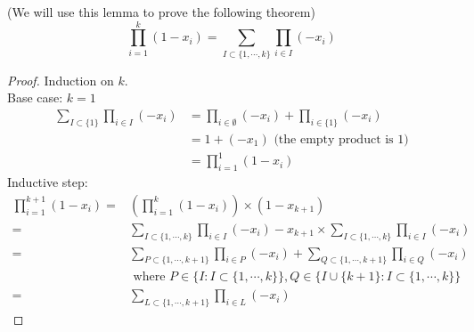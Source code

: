 \begin{lemma}
    (We will use this lemma to prove the following theorem)
    $$\prod_{i=1}^k(1-x_i)=\sum_{I \subset \{1,\cdots,k\}} \prod_{i \in I}(-x_i)$$
\end{lemma}
\begin{proof}
    Induction on $k$.\\
    Base case: $k=1$ 
    \begin{equation}
        \begin{split}
            \sum_{I \subset \{1\}} \prod_{i \in I}(-x_i) &= \prod_{i \in \emptyset}(-x_i)+ \prod_{i \in \{1\}}(-x_i)\\
            &= 1 + (-x_1) \text{ (the empty product is 1)}\\
            &= \prod_{i=1}^1(1-x_i)
        \end{split}
    \end{equation}
    Inductive step:
    \begin{equation}
        \begin{split}
            \prod_{i=1}^{k+1}(1-x_i) =& (\prod_{i=1}^{k}(1-x_i))\times (1-x_{k+1})\\
            =& \sum_{I \subset \{1,\cdots,k\}} \prod_{i \in I}(-x_i) - x_{k+1} \times \sum_{I \subset \{1,\cdots,k\}} \prod_{i \in I}(-x_i)\\
            =& \sum_{P \subset \{1,\cdots,k+1\}} \prod_{i \in P}(-x_i) + \sum_{Q \subset \{1,\cdots,k+1\}} \prod_{i \in Q}(-x_i)\\
            & \text{ where } P \in \{I: I \subset \{1,\cdots,k\}\}, Q \in \{I \cup\{k+1\}: I \subset \{1,\cdots,k\}\}\\
            =& \sum_{L \subset \{1,\cdots,k+1\}} \prod_{i \in L}(-x_i)
        \end{split}
    \end{equation}
\end{proof}



